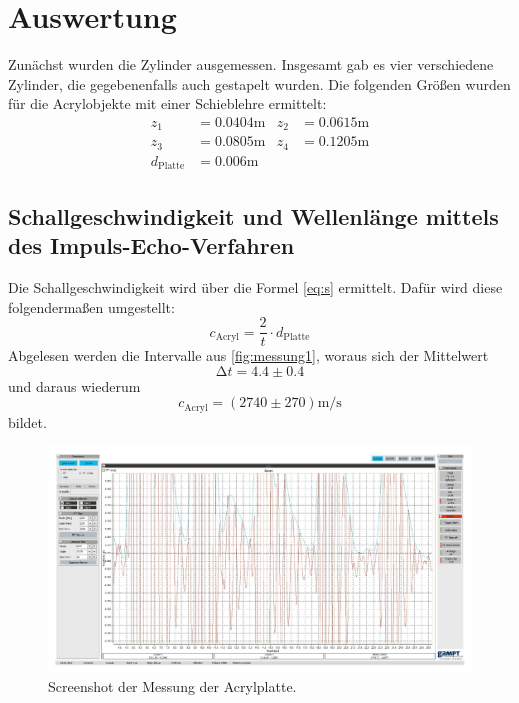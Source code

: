\section{Auswertung}
\label{sec:Auswertung}

Zunächst wurden die Zylinder ausgemessen. Insgesamt gab es vier verschiedene Zylinder, die gegebenenfalls auch gestapelt wurden.
Die folgenden Größen wurden für die Acrylobjekte mit einer Schieblehre ermittelt:
\begin{align*}
  z_1 &= 0.0404 \unit\meter & z_2 &= 0.0615 \unit\meter \\
  z_3 &= 0.0805 \unit\meter & z_4 &= 0.1205 \unit\meter \\
  d_\text{Platte} &= 0.006 \unit\meter
\end{align*}

\subsection{Schallgeschwindigkeit und Wellenlänge mittels des Impuls-Echo-Verfahren}

Die Schallgeschwindigkeit wird über die Formel \autoref{eq:s} ermittelt.
Dafür wird diese folgendermaßen umgestellt:
\begin{equation}\label{eq:c_schall}
  c_\text{Acryl} = \frac{2}{t} \cdot d_\text{Platte}
\end{equation}
Abgelesen werden die Intervalle aus \autoref{fig:messung1}, woraus sich der Mittelwert
\begin{equation}
  \increment t = 4.4 \pm 0.4
\end{equation}
und daraus wiederum
\begin{equation}
  c_\text{Acryl} = (2740 \pm 270) \unit{\meter / \second}
\end{equation}
bildet. 

\begin{figure} [H]
  \centering
  \includegraphics[width =\linewidth]{pictures/Schallgeschwindigkeit/Messung1.pdf}
  \caption{Screenshot der Messung der Acrylplatte.}
  \label{fig:messung1}
\end{figure}


